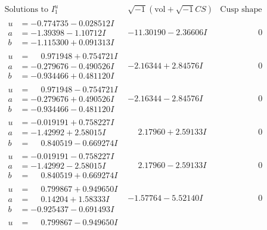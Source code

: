 \documentclass[1p]{elsarticle_modified}
\theoremstyle{definition}
\newcommand{\I}{\sqrt{-1}}
\begin{document}
$$\begin{array}{c|c|c}
\text{Solutions to }I^u_{1}& \I (\text{vol} + \sqrt{-1}CS) & \text{Cusp shape}\\
 \hline 
\begin{aligned}
u &= -0.774735 - 0.028512 I \\
a &= -1.39398 - 1.10712 I \\
b &= -1.115300 + 0.091313 I\end{aligned}
 & -11.30190 - 2.36606 I & \phantom{-0.000000 } 0 \\ \hline\begin{aligned}
u &= \phantom{-}0.971948 + 0.754721 I \\
a &= -0.279676 - 0.490526 I \\
b &= -0.934466 + 0.481120 I\end{aligned}
 & -2.16344 + 2.84576 I & \phantom{-0.000000 } 0 \\ \hline\begin{aligned}
u &= \phantom{-}0.971948 - 0.754721 I \\
a &= -0.279676 + 0.490526 I \\
b &= -0.934466 - 0.481120 I\end{aligned}
 & -2.16344 - 2.84576 I & \phantom{-0.000000 } 0 \\ \hline\begin{aligned}
u &= -0.019191 + 0.758227 I \\
a &= -1.42992 + 2.58015 I \\
b &= \phantom{-}0.840519 - 0.669274 I\end{aligned}
 & \phantom{-}2.17960 + 2.59133 I & \phantom{-0.000000 } 0 \\ \hline\begin{aligned}
u &= -0.019191 - 0.758227 I \\
a &= -1.42992 - 2.58015 I \\
b &= \phantom{-}0.840519 + 0.669274 I\end{aligned}
 & \phantom{-}2.17960 - 2.59133 I & \phantom{-0.000000 } 0 \\ \hline\begin{aligned}
u &= \phantom{-}0.799867 + 0.949650 I \\
a &= \phantom{-}0.14204 + 1.58333 I \\
b &= -0.925437 - 0.691493 I\end{aligned}
 & -1.57764 - 5.52140 I & \phantom{-0.000000 } 0 \\ \hline\begin{aligned}
u &= \phantom{-}0.799867 - 0.949650 I \\

\end{aligned}
\end{array}$$
\end{document}
